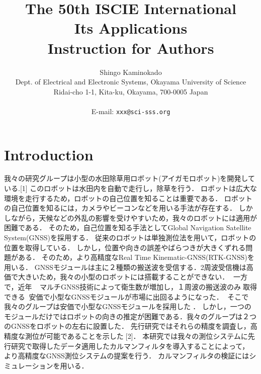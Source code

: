 \documentclass[a4paper]{article}
\begin{document}
\date{}
\title{\LARGE{\bf
The 50th ISCIE International \\
 Its Applications\\
Instruction for Authors}
}
\author{
Shingo Kaminokado \\
Dept. of Electrical and Electronic Systems, Okayama University of Science\\
Ridai-cho 1-1, Kita-ku, Okayama, 700-0005 Japan\\
\\E-mail: \texttt{xxx@sci-sss.org}
}

\maketitle
\thispagestyle{empty}


\section{Introduction}
我々の研究グループは小型の水田除草用ロボット(アイガモロボット)を開発している.[1]
このロボットは水田内を自動で走行し，除草を行う．
ロボットは広大な環境を走行するため，ロボットの自己位置を知ることは重要である．
ロボットの自己位置を知るには，カメラやビーコンなどを用いる手法が存在する．
しかしながら，天候などの外乱の影響を受けやすいため，我々のロボットには適用が困難である．
そのため，自己位置を知る手法としてGlobal Navigation Satellite System(GNSS)を採用する．
従来のロボットは単独測位法を用いて，ロボットの位置を取得している．
しかし，位置や向きの誤差やばらつきが大きくずれる問題がある．
そのため，より高精度なReal Time Kinematic-GNSS(RTK-GNSS)を用いる．
GNSSモジュールは主に２種類の搬送波を受信する．2周波受信機は高価で大きいため，我々の小型のロボットには搭載することができない．
一方で，近年マルチGNSS技術によって衛生数が増加し，１周波の搬送波のみ取得できる安価で小型なGNSSモジュールが市場に出回るようになった．
そこで我々のグループは安価で小型なGNSSモジュールを採用した．
しかし，一つのモジュールだけではロボットの向きの推定が困難である．我々のグループは２つのGNSSをロボットの左右に設置した．
先行研究ではそれらの精度を調査し，高精度な測位が可能であることを示した[2]．
本研究では我々の測位システムに先行研究で取得したデータ適用したカルマンフィルタを導入することによって，
より高精度なGNSS測位システムの提案を行う．
カルマンフィルタの検証にはシミュレーションを用いる．
\end{document}
